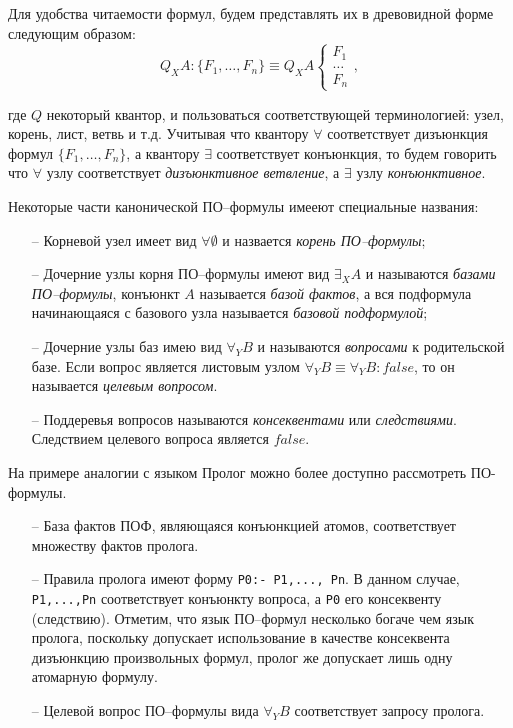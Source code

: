 Для удобства читаемости формул, будем представлять их в древовидной форме следующим образом:
$$Q_XA\colon\{F_1,\ldots,F_n\} \equiv Q_XA \left\{
\begin{array}{lcl}
 F_1 \\
 \ldots \\
 F_n
\end{array}
\right.,$$

\noindent{}где $Q$ некоторый квантор, и пользоваться соответствующей терминологией: узел, корень, лист, ветвь и т.д. Учитывая что квантору $\forall$ соответствует дизъюнкция формул $\{F_1,\ldots,F_n\}$, а квантору $\exists$ соответствует конъюнкция, то будем говорить что $\forall$ узлу соответствует {\em дизъюнктивное ветвление}, а $\exists$ узлу {\em конъюнктивное}.

Некоторые части канонической ПО--формулы имееют специальные названия:
\begin{itemize}
\item[--] Корневой узел имеет вид $\forall \emptyset$ и назвается {\em корень ПО--формулы};

\item[--] Дочерние узлы корня ПО--формулы имеют вид $\exists_XA$ и называются {\em базами ПО--формулы}, конъюнкт $A$ называется {\em базой фактов}, а вся подформула начинающаяся с базового узла называется {\em базовой подформулой};

\item[--] Дочерние узлы баз имею вид $\forall_YB$ и называются {\em вопросами} к родительской базе. Если вопрос является листовым узлом $\forall_YB \equiv \forall_YB\colon false$, то он называется {\em целевым вопросом}. %

\item[--] Поддеревья вопросов называются {\em консеквентами} или {\em следствиями}. Следствием целевого вопроса является $false$.

\end{itemize}


На примере аналогии с языком Пролог можно более доступно рассмотреть ПО-формулы.

\begin{itemize}
\item[--] База фактов ПОФ, являющаяся конъюнкцией атомов, соответствует множеству фактов пролога.
\item[--] Правила пролога имеют форму \texttt{P0:- P1,..., Pn}. В данном случае, \texttt{P1,...,Pn} соответствует конъюнкту вопроса, а \texttt{P0} его консеквенту (следствию). Отметим, что язык ПО--формул несколько богаче чем язык пролога, поскольку допускает использование в качестве консеквента дизъюнкцию произвольных формул, пролог же допускает лишь одну атомарную формулу.
\item[--] Целевой вопрос ПО--формулы вида $\forall_YB$ соответствует запросу пролога.
\end{itemize}

